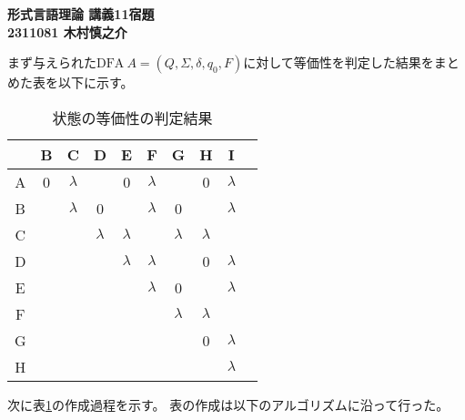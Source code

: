 \documentclass[uplatex,dvipdfmx,a4paper,10pt]{jsarticle}
\begin{document}
    \begin{center}
        {\Large{\bf 形式言語理論 講義11宿題}} \\
        {\bf 2311081 木村慎之介} \\
    \end{center}

    \hspace{1em}まず与えられた\(\text{DFA}\ A = (Q,\Sigma,\delta,q_0,F)\)に対して等価性を判定した結果をまとめた表を以下に示す。

    \begin{table}[H]
      \begin{center}
        \caption{状態の等価性の判定結果}
        \label{table_state_equality}
        \begin{tabular}{c|ccccccccc} \hline
            & B & C           & D          & E           & F           & G           & H           & I           \\ \hline
          A & 0 & \(\lambda\) &            & 0           & \(\lambda\) &             & 0           & \(\lambda\) \\
          B &   & \(\lambda\) & 0          &             & \(\lambda\) & 0           &             & \(\lambda\) \\
          C &   &             & \(\lambda\)& \(\lambda\) &             & \(\lambda\) & \(\lambda\) &             \\
          D &   &             &            & \(\lambda\) & \(\lambda\) &             & 0           & \(\lambda\) \\
          E &   &             &            &             & \(\lambda\) & 0           &             & \(\lambda\) \\
          F &   &             &            &             &             & \(\lambda\) & \(\lambda\) &             \\
          G &   &             &            &             &             &             & 0           & \(\lambda\) \\
          H &   &             &            &             &             &             &             & \(\lambda\) \\ \hline
        \end{tabular}
      \end{center}
    \end{table}

    \hspace{1em}次に表\ref{table_state_equality}の作成過程を示す。
    表の作成は以下のアルゴリズムに沿って行った。
\end{document}
